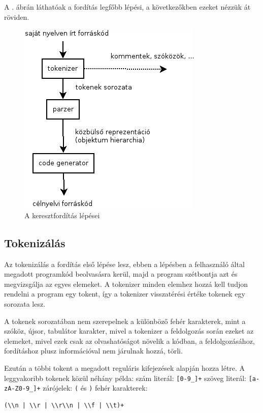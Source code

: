 A . ábrán láthatóak a fordítás legfőbb lépési, a következőkben ezeket nézzük át röviden.

\begin{figure}
\centering
\includegraphics[scale=1]{kepek/process.png}
\caption{A keresztfordítás lépései}
\label{fig:process}
\end{figure}

\subsection{Tokenizálás}

Az tokenizálás a fordítás első lépése lesz, ebben a lépésben a felhasználó által megadott programkód beolvasásra kerül, majd a program szétbontja azt és megvizsgálja az egyes elemeket. A tokenizer minden elemhez hozzá kell tudjon rendelni a program egy tokent, így a tokenizer visszatérési értéke tokenek egy sorozata lesz.

A tokenek sorozatában nem szerepelnek a különböző fehér karakterek, mint a szóköz, újsor, tabulátor karakter, mivel a tokenizer a feldolgozás során ezeket az elemeket, mivel ezek csak az olvashatóságot növelik a kódban, a feldolgozásához, fordításhoz plusz információval nem járulnak hozzá, törli.

Ezután a többi tokent a megadott reguláris kifejezések alapján hozza létre. A leggyakoribb tokenek közül néhány példa:
szám literál: \texttt{[0-9\_]+}
szöveg literál: \texttt{[a-zA-Z0-9\_]+}
zárójelek: \texttt{(} és \texttt{)}
fehér karakterek:
\begin{verbatim}
(\\n | \\r | \\r\\n | \\f | \\t)+
\end{verbatim}

